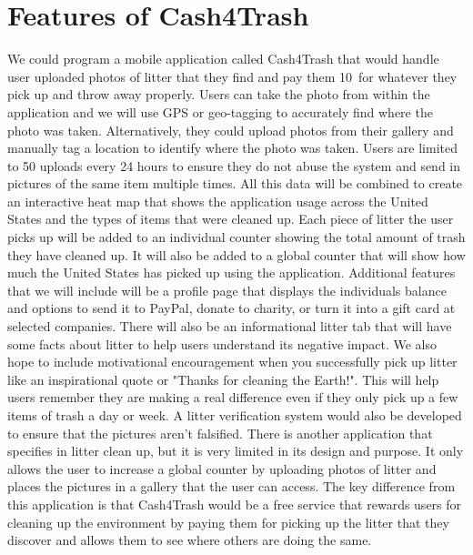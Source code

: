 \documentclass[letterpaper,12pt,titlepage]{article}
\begin{document}
\section{Features of Cash4Trash}
We could program a mobile application called Cash4Trash that would handle user uploaded photos of litter that they find and pay them 10\cent\ for whatever they pick up and throw away properly. Users can take the photo from within the application and we will use GPS or geo-tagging to accurately find where the photo was taken. Alternatively, they could upload photos from their gallery and manually tag a location to identify where the photo was taken. Users are limited to 50 uploads every 24 hours to ensure they do not abuse the system and send in pictures of the same item multiple times. All this data will be combined to create an interactive heat map that shows the application usage across the United States and the types of items that were cleaned up. Each piece of litter the user picks up will be added to an individual counter showing the total amount of trash they have cleaned up. It will also be added to a global counter that will show how much the United States has picked up using the application. 
\newline
\newline
Additional features that we will include will be a profile page that displays the individuals balance and options to send it to PayPal, donate to charity, or turn it into a gift card at selected companies. There will also be an informational litter tab that will have some facts about litter to help users understand its negative impact. We also hope to include motivational encouragement when you successfully pick up litter like an inspirational quote or "Thanks for cleaning the Earth!". This will help users remember they are making a real difference even if they only pick up a few items of trash a day or week. A litter verification system would also be developed to ensure that the pictures aren't falsified.
\newline
\newline
There is another application that specifies in litter clean up, but it is very limited in its design and purpose. It only allows the user to increase a global counter by uploading photos of litter and places the pictures in a gallery that the user can access. The key difference from this application is that Cash4Trash would be a free service that rewards users for cleaning up the environment by paying them for picking up the litter that they discover and allows them to see where others are doing the same.
\end{document}
